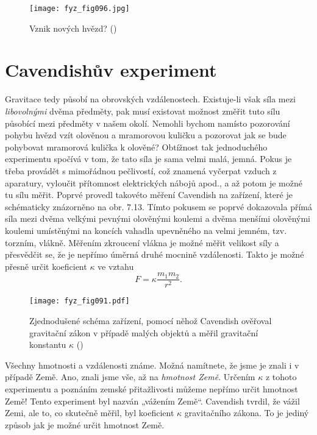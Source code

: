     \begin{figure}[ht!]  %
      \centering
      \texttt{[image: fyz\_fig096.jpg]}
      \caption{Vznik nových hvězd? (\cite[s.~101]{Feynman01})}
      \label{fyz:fig096}
    \end{figure}
    
  \section{Cavendishův experiment}
    Gravitace tedy působí na obrovských vzdálenostech. Existuje-li však síla mezi 
    \emph{libovolnými} dvěma předměty, pak musí existovat možnost změřit tuto sílu působící mezi 
    předměty v našem okolí. Nemohli bychom namísto pozorování pohybu hvězd vzít olověnou a 
    mramorovou kuličku a pozorovat jak se bude pohybovat mramorová kulička k olověné? Obtížnost tak 
    jednoduchého experimentu spočívá v tom, že tato síla je sama velmi malá, jemná. Pokus je třeba 
    provádět s mimořádnou pečlivostí, což znamená vyčerpat vzduch z aparatury, vyloučit přítomnost 
    elektrických nábojů apod., a až potom je možné tu sílu měřit. Poprvé provedl takovéto měření 
    Cavendish na zařízení, které je schématicky znázorněno na obr. 7.13. Tímto pokusem se poprvé 
    dokazovala přímá síla mezi dvěma velkými pevnými olověnými koulemi a dvěma menšími olověnými 
    koulemi umístěnými na koncích vahadla upevněného na velmi jemném, tzv. torzním, vlákně. Měřením 
    zkroucení vlákna je možné měřit velikost síly a přesvědčit se, že je nepřímo úměrná druhé 
    mocnině vzdálenosti. Takto je možné přesně určit koeficient \(\kappa\) ve vztahu
    \begin{equation}\label{FYZ:eq094}
      F = \kappa\frac{m_1m_2}{r^2}.
    \end{equation}
    
    \begin{figure}[ht!]  %
      \centering
      \texttt{[image: fyz\_fig091.pdf]}
      \caption{Zjednodušené schéma zařízení, pomocí něhož Cavendish ověřoval gravitační zákon v 
               případě malých objektů a měřil gravitační konstantu \(\kappa\)
               (\cite[s.~102]{Feynman01})}
      \label{fyz:fig091}
    \end{figure}
    Všechny hmotnosti a vzdálenosti známe. Možná namítnete, že jsme je znali i v případě Země. Ano, 
    znali jsme vše, až na \emph{hmotnost Země}. Určením \(\kappa\) z tohoto experimentu a poznáním 
    zemské přitažlivosti můžeme nepřímo určit hmotnost Země! Tento experiment byl nazván „vážením 
    Země“. Cavendish tvrdil, že vážil Zemi, ale to, co skutečně měřil, byl koeficient \(\kappa\) 
    gravitačního zákona. To je jediný způsob jak je možné určit hmotnost Země.
    
